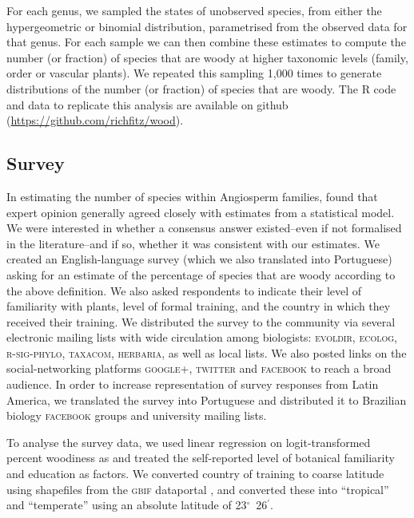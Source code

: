 For each genus, we sampled the states of unobserved species, from
either the hypergeometric or binomial distribution, parametrised from
the observed data for that genus.
%
For each sample we can then combine these estimates to compute the
number (or fraction) of species that are woody at higher taxonomic
levels (family, order or vascular plants).  We repeated this sampling
1,000 times to generate distributions of the number (or fraction) of
species that are woody.
%
The R code and data to replicate this analysis are available on github
(\url{https://github.com/richfitz/wood}).

\subsection{Survey}

In estimating the number of species within Angiosperm families,
\citet{joppa2010} found that expert opinion generally agreed closely
with estimates from a statistical model.  We were interested in
whether a consensus answer existed--even if not formalised in the
literature--and if so, whether it was consistent with our
estimates.
% 
We created an English-language survey (which we also translated into
Portuguese) asking for an estimate of the percentage of species that
are woody according to the above definition.  We also asked
respondents to indicate their level of familiarity with plants, level
of formal training, and the country in which they received their
training. We distributed the survey to the 
community via several electronic
mailing lists with wide circulation among biologists: \textsc{evoldir},
\textsc{ecolog}, \textsc{\mbox{r-sig-phylo}}, \textsc{taxacom},
\textsc{herbaria}, as well as local lists. We also posted links on the
social-networking platforms \textsc{google+}, \textsc{twitter} and
\textsc{facebook} to reach a broad audience.
%
In order to increase representation of survey responses from Latin
America, we translated the survey into Portuguese and distributed it
to Brazilian biology \textsc{facebook} groups and university mailing
lists.

To analyse the survey data, we used linear regression on
logit-transformed percent woodiness as \citep[see][]{wartonarcsine}
and treated the self-reported level of botanical familiarity and
education as factors.  We converted country of training to coarse
latitude using shapefiles
from the \textsc{gbif} dataportal \citep{GBIFdata},
and converted these into ``tropical'' and ``temperate'' using an
absolute latitude of 23$^\circ$~26$^\prime$. 

